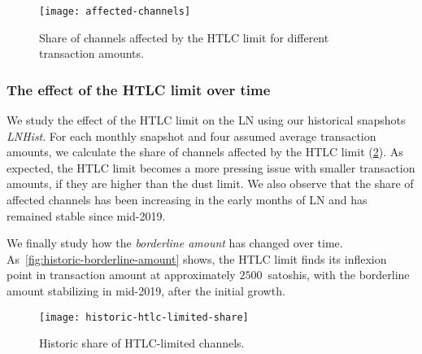 \begin{figure}
	\centering
	\texttt{[image: affected-channels]}
	\caption{Share of channels affected by the HTLC limit for different transaction amounts. \label{fig:affected-channels}}
\end{figure}



\subsubsection*{The effect of the HTLC limit over time}


We study the effect of the HTLC limit on the LN using our historical snapshots \emph{LNHist}.
For each monthly snapshot and four assumed average transaction amounts, we calculate the share of channels affected by the HTLC limit (\cref{fig:historic-htlc-limited-share}).
As expected, the HTLC limit becomes a more pressing issue 
with smaller transaction amounts, if they are higher than the dust limit.
We also observe that the share of affected channels has been increasing in the early months of LN and has remained stable since mid-2019.

We finally study how the \textit{borderline amount} has changed over time. 
As~\cref{fig:historic-borderline-amount} shows, the HTLC limit finds 
its inflexion point in transaction amount at approximately $2500$~satoshis, with the borderline amount stabilizing in mid-2019, after the initial growth.

\begin{figure}[tb]
	\centering
	\texttt{[image: historic-htlc-limited-share]}
	\caption{Historic share of HTLC-limited channels.\label{fig:historic-htlc-limited-share}}
\end{figure}

